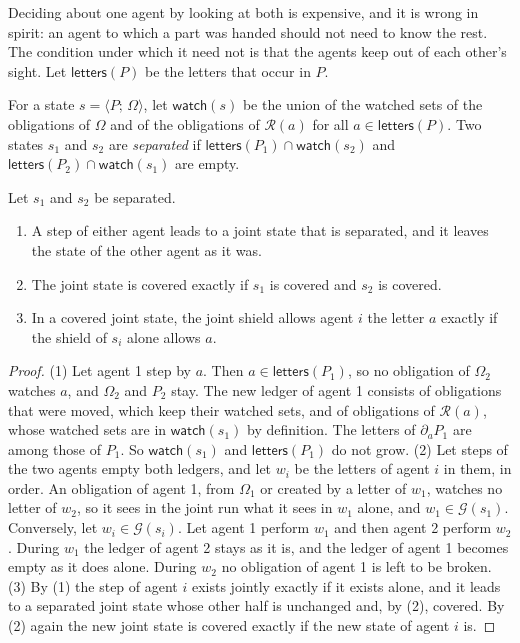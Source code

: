 \documentclass[acmsmall,nonacm,screen]{acmart}
\newcommand{\kw}[1]{\mathsf{#1}}
\newcommand{\st}[2]{\langle #1;\, #2 \rangle}
\newcommand{\goal}[1]{\mathcal{G}(#1)}
\newcommand{\rules}{\mathcal{R}}
\newcommand{\dv}[2]{\partial_{#1}#2}
\newcommand{\letters}[1]{\kw{letters}(#1)}
\newcommand{\watch}[1]{\kw{watch}(#1)}
\begin{document}
Deciding about one agent by looking at both is expensive, and it is wrong in spirit: an
agent to which a part was handed should not need to know the rest. The condition under
which it need not is that the agents keep out of each other's sight. Let $\letters{P}$ be
the letters that occur in $P$.

\begin{definition}[Separated]
\label{def:sep}
For a state $s = \st{P}{\Omega}$, let $\watch{s}$ be the union of the watched sets of the
obligations of $\Omega$ and of the obligations of $\rules(a)$ for all $a \in \letters{P}$.
Two states $s_1$ and $s_2$ are \emph{separated} if $\letters{P_1} \cap \watch{s_2}$ and
$\letters{P_2} \cap \watch{s_1}$ are empty.
\end{definition}

\begin{theorem}[Frame]
\label{thm:frame}
Let $s_1$ and $s_2$ be separated.
\begin{enumerate}
\item A step of either agent leads to a joint state that is separated, and it leaves the
  state of the other agent as it was.
\item The joint state is covered exactly if $s_1$ is covered and $s_2$ is covered.
\item In a covered joint state, the joint shield allows agent $i$ the letter $a$ exactly if
  the shield of $s_i$ alone allows $a$.
\end{enumerate}
\end{theorem}

\begin{proof}
(1) Let agent 1 step by $a$. Then $a \in \letters{P_1}$, so no obligation of $\Omega_2$
watches $a$, and $\Omega_2$ and $P_2$ stay. The new ledger of agent 1 consists of
obligations that were moved, which keep their watched sets, and of obligations of
$\rules(a)$, whose watched sets are in $\watch{s_1}$ by definition. The letters of
$\dv{a}{P_1}$ are among those of $P_1$. So $\watch{s_1}$ and $\letters{P_1}$ do not grow.
(2) Let steps of the two agents empty both ledgers, and let $w_i$ be the letters of agent
$i$ in them, in order. An obligation of agent 1, from $\Omega_1$ or created by a letter of
$w_1$, watches no letter of $w_2$, so it sees in the joint run what it sees in $w_1$ alone,
and $w_1 \in \goal{s_1}$. Conversely, let $w_i \in \goal{s_i}$. Let agent 1 perform $w_1$
and then agent 2 perform $w_2$. During $w_1$ the ledger of agent 2 stays as it is, and the
ledger of agent 1 becomes empty as it does alone. During $w_2$ no obligation of agent 1 is
left to be broken. (3) By (1) the step of agent $i$ exists jointly exactly if it exists
alone, and it leads to a separated joint state whose other half is unchanged and, by (2),
covered. By (2) again the new joint state is covered exactly if the new state of agent $i$
is.
\end{proof}
\end{document}
